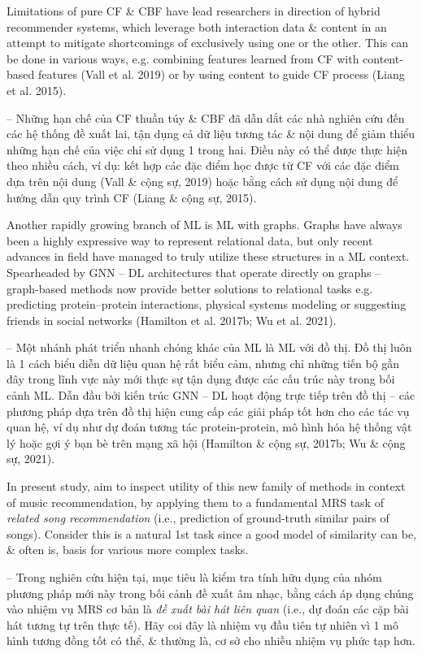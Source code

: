 \documentclass{article}
\begin{document}
\begin{itemize}
    Limitations of pure CF \& CBF have lead researchers in direction of hybrid recommender systems, which leverage both interaction data \& content in an attempt to mitigate shortcomings of exclusively using one or the other. This can be done in various ways, e.g. combining features learned from CF with content-based features (Vall et al. 2019) or by using content to guide CF process (Liang et al. 2015).

    -- Những hạn chế của CF thuần túy \& CBF đã dẫn dắt các nhà nghiên cứu đến các hệ thống đề xuất lai, tận dụng cả dữ liệu tương tác \& nội dung để giảm thiểu những hạn chế của việc chỉ sử dụng 1 trong hai. Điều này có thể được thực hiện theo nhiều cách, ví dụ: kết hợp các đặc điểm học được từ CF với các đặc điểm dựa trên nội dung (Vall \& cộng sự, 2019) hoặc bằng cách sử dụng nội dung để hướng dẫn quy trình CF (Liang \& cộng sự, 2015).

    Another rapidly growing branch of ML is ML with graphs. Graphs have always been a highly expressive way to represent relational data, but only recent advances in field have managed to truly utilize these structures in a ML context. Spearheaded by GNN -- DL architectures that operate directly on graphs -- graph-based methods now provide better solutions to relational tasks e.g. predicting protein--protein interactions, physical systems modeling or suggesting friends in social networks (Hamilton et al. 2017b; Wu et al. 2021).

    -- Một nhánh phát triển nhanh chóng khác của ML là ML với đồ thị. Đồ thị luôn là 1 cách biểu diễn dữ liệu quan hệ rất biểu cảm, nhưng chỉ những tiến bộ gần đây trong lĩnh vực này mới thực sự tận dụng được các cấu trúc này trong bối cảnh ML. Dẫn đầu bởi kiến trúc GNN -- DL hoạt động trực tiếp trên đồ thị -- các phương pháp dựa trên đồ thị hiện cung cấp các giải pháp tốt hơn cho các tác vụ quan hệ, ví dụ như dự đoán tương tác protein-protein, mô hình hóa hệ thống vật lý hoặc gợi ý bạn bè trên mạng xã hội (Hamilton \& cộng sự, 2017b; Wu \& cộng sự, 2021).

    In present study, aim to inspect utility of this new family of methods in context of music recommendation, by applying them to a fundamental MRS task of {\it related song recommendation} (i.e., prediction of ground-truth similar pairs of songs). Consider this is a natural 1st task since a good model of similarity can be, \& often is, basis for various more complex tasks.

    -- Trong nghiên cứu hiện tại, mục tiêu là kiểm tra tính hữu dụng của nhóm phương pháp mới này trong bối cảnh đề xuất âm nhạc, bằng cách áp dụng chúng vào nhiệm vụ MRS cơ bản là {\it đề xuất bài hát liên quan} (i.e., dự đoán các cặp bài hát tương tự trên thực tế). Hãy coi đây là nhiệm vụ đầu tiên tự nhiên vì 1 mô hình tương đồng tốt có thể, \& thường là, cơ sở cho nhiều nhiệm vụ phức tạp hơn.


\end{itemize}
\end{document}
